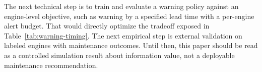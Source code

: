 The next technical step is to train and evaluate a warning policy against an
engine-level objective, such as warning by a specified lead time with a
per-engine alert budget. That would directly optimize the tradeoff exposed in
Table~\ref{tab:warning-timing}. The next empirical step is external validation
on labeled engines with maintenance outcomes. Until then, this paper should be
read as a controlled simulation result about information value, not a deployable
maintenance recommendation.
